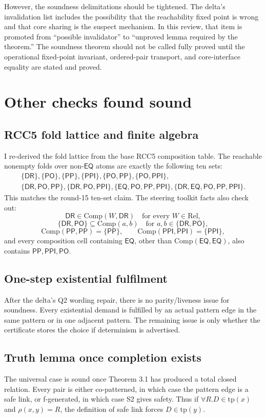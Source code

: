 \documentclass[11pt]{article}
\newcommand{\Rel}{\ensuremath{\mathrm{Rel}}}
\newcommand{\EQ}{\ensuremath{\mathsf{EQ}}}
\newcommand{\PP}{\ensuremath{\mathsf{PP}}}
\newcommand{\PPI}{\ensuremath{\mathsf{PPI}}}
\newcommand{\PO}{\ensuremath{\mathsf{PO}}}
\newcommand{\DR}{\ensuremath{\mathsf{DR}}}
\newcommand{\Comp}{\ensuremath{\mathrm{Comp}}}
\newcommand{\tp}{\ensuremath{\mathrm{tp}}}
\begin{document}
However, the soundness delimitations should be tightened.  The delta's invalidation list includes the possibility that the reachability fixed point is wrong and that core sharing is the suspect mechanism.  In this review, that item is promoted from ``possible invalidator'' to ``unproved lemma required by the theorem.''  The soundness theorem should not be called fully proved until the operational fixed-point invariant, ordered-pair transport, and core-interface equality are stated and proved.

\section{Other checks found sound}

\subsection{RCC5 fold lattice and finite algebra}
I re-derived the fold lattice from the base RCC5 composition table.  The reachable nonempty folds over non-\EQ{} atoms are exactly the following ten sets:
\[
\begin{gathered}
\{\DR\},\{\PO\},\{\PP\},\{\PPI\},\{\PO,\PP\},\{\PO,\PPI\},\\
\{\DR,\PO,\PP\},\{\DR,\PO,\PPI\},\{\EQ,\PO,\PP,\PPI\},\{\DR,\EQ,\PO,\PP,\PPI\}.
\end{gathered}
\]
This matches the round-15 ten-set claim.  The steering toolkit facts also check out:
\[
\DR\in\Comp(W,\DR)\quad\text{for every } W\in\Rel,
\]
\[
\{\DR,\PO\}\subseteq\Comp(a,b)\quad\text{for }a,b\in\{\DR,\PO\},
\]
\[
\Comp(\PP,\PP)=\{\PP\},\qquad \Comp(\PPI,\PPI)=\{\PPI\},
\]
and every composition cell containing \EQ{}, other than \(\Comp(\EQ,\EQ)\), also contains \(\PP,\PPI,\PO\).

\subsection{One-step existential fulfilment}
After the delta's Q2 wording repair, there is no parity/liveness issue for soundness.  Every existential demand is fulfilled by an actual pattern edge in the same pattern or in one adjacent pattern.  The remaining issue is only whether the certificate stores the choice if determinism is advertised.

\subsection{Truth lemma once completion exists}
The universal case is sound once Theorem 3.1 has produced a total closed relation.  Every pair is either co-patterned, in which case the pattern edge is a safe link, or f-generated, in which case S2 gives safety.  Thus if \(\forall R.D\in\tp(x)\) and \(\rho(x,y)=R\), the definition of safe link forces \(D\in\tp(y)\).
\end{document}
